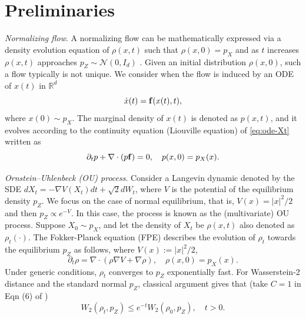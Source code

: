 \documentclass{article}
\theoremstyle{remark}
\theoremstyle{plain}
\newcommand{\R}{\mathbb{R}}
\newcommand{\calN}{\mathcal{N}}
\begin{document}
%




%
\section{{Preliminaries}}\label{sec:background}
%

{\it Normalizing flow}. 
A normalizing flow can be mathematically expressed via a density evolution equation of $\rho(x,t)$ such that $\rho(x,0) = p_X$ and as $t$ increases $\rho(x,t)$ approaches $p_Z \sim \calN(0, I_d)$ \citep{tabak2010density}.
Given an initial distribution $\rho(x,0)$, such a flow typically is not unique.
We consider when the flow is induced by  an ODE of $x(t)$ in $\R^d$
\begin{equation}\label{eq:ode-Xt}
\dot{x}(t) = {\bf f} (x(t), t),
\end{equation}
where  $x(0) \sim p_X$. 
 The marginal density of $x(t)$ is denoted as $p (x,t)$, and it evolves according to the continuity equation (Liouville equation) of \eqref{eq:ode-Xt} written as
\begin{equation} \label{eq:Liouville}
\partial_{t} p + \nabla\cdot( p {\bf f}) =0, \quad p(x,0) = p_X(x).
\end{equation}



\noindent 
{\it Ornstein–Uhlenbeck (OU) process}.
Consider a Langevin dynamic denoted by the SDE $dX_{t}=- \nabla V (X_{t}) dt+\sqrt{2}dW_{t}$, where $V$ is the potential of the equilibrium density $p_Z$. 
We focus on the case of normal equilibrium, that is, $V(x) = |x|^2/2$ and then $p_Z \propto e^{-V}$. In this case, the process is known as the (multivariate) OU process. Suppose $X_0 \sim p_X$, and let the density of $X_t$ be $\rho(x,t)$ also denoted as $\rho_t(\cdot)$. The Fokker-Planck equation (FPE) describes the evolution of $\rho_t$ towards the equilibrium $p_Z$ as follows, where $V(x) := {|x|^{2}}/{2}$,
\begin{equation}\label{eq:fokker-planck}
\partial_{t}\rho=\nabla\cdot(\rho\nabla V + \nabla \rho), 
%
\quad \rho(x,0) = p_X(x).
\end{equation}
Under generic conditions, $\rho_t$ converges to  $p_Z$ exponentially fast. 
For Wasserstein-2 distance and the standard normal $p_Z$, classical argument gives that (take $C=1$ in Eqn (6) of \cite{bolley2012convergence})
\begin{equation}\label{eq:W2-convergence-FK}
W_2( \rho_t, p_Z) \le e^{-t} W_2( \rho_0, p_Z), \quad t > 0.
\end{equation}
\end{document}
